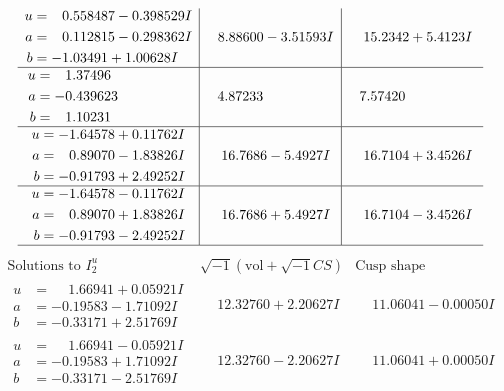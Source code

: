 \documentclass[1p]{elsarticle_modified}
\theoremstyle{definition}
\newcommand{\I}{\sqrt{-1}}
\begin{document}
$$\begin{array}{c|c|c}
\begin{aligned}
u &= \phantom{-}0.558487 - 0.398529 I \\
a &= \phantom{-}0.112815 - 0.298362 I \\
b &= -1.03491 + 1.00628 I\end{aligned}
 & \phantom{-}8.88600 - 3.51593 I & \phantom{-}15.2342 + 5.4123 I \\ \hline\begin{aligned}
u &= \phantom{-}1.37496\phantom{ +0.000000I} \\
a &= -0.439623\phantom{ +0.000000I} \\
b &= \phantom{-}1.10231\phantom{ +0.000000I}\end{aligned}
 & \phantom{-}4.87233\phantom{ +0.000000I} & \phantom{-}7.57420\phantom{ +0.000000I} \\ \hline\begin{aligned}
u &= -1.64578 + 0.11762 I \\
a &= \phantom{-}0.89070 - 1.83826 I \\
b &= -0.91793 + 2.49252 I\end{aligned}
 & \phantom{-}16.7686 - 5.4927 I & \phantom{-}16.7104 + 3.4526 I \\ \hline\begin{aligned}
u &= -1.64578 - 0.11762 I \\
a &= \phantom{-}0.89070 + 1.83826 I \\
b &= -0.91793 - 2.49252 I\end{aligned}
 & \phantom{-}16.7686 + 5.4927 I & \phantom{-}16.7104 - 3.4526 I\\
 \hline 
 \end{array}$$\newpage$$\begin{array}{c|c|c}  
\text{Solutions to }I^u_{2}& \I (\text{vol} + \sqrt{-1}CS) & \text{Cusp shape}\\
 \hline 
\begin{aligned}
u &= \phantom{-}1.66941 + 0.05921 I \\
a &= -0.19583 - 1.71092 I \\
b &= -0.33171 + 2.51769 I\end{aligned}
 & \phantom{-}12.32760 + 2.20627 I & \phantom{-}11.06041 - 0.00050 I \\ \hline\begin{aligned}
u &= \phantom{-}1.66941 - 0.05921 I \\
a &= -0.19583 + 1.71092 I \\
b &= -0.33171 - 2.51769 I\end{aligned}
 & \phantom{-}12.32760 - 2.20627 I & \phantom{-}11.06041 + 0.00050 I \\ \hline\begin{aligned}

\end{aligned}
\end{array}$$
\end{document}
